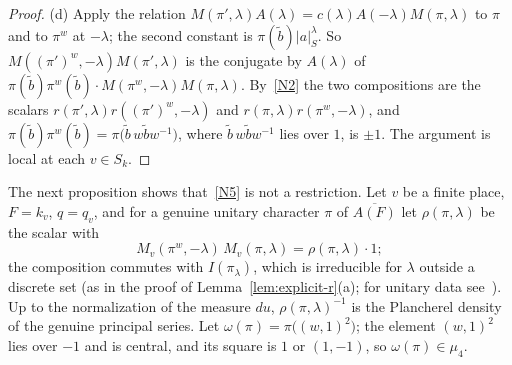 \begin{proof}
(d) Apply the relation $M(\pi',\lambda)A(\lambda)=c(\lambda)A(-\lambda)
M(\pi,\lambda)$ to $\pi$ and to $\pi^w$ at $-\lambda$; the second constant
is $\pi(\tilde b)|a|_S^{\lambda}$. So $M((\pi')^w,-\lambda)M(\pi',\lambda)$
is the conjugate by $A(\lambda)$ of $\pi(\tilde b)\pi^w(\tilde b)\cdot
M(\pi^w,-\lambda)M(\pi,\lambda)$. By~\ref{N2} the two compositions are the
scalars $r(\pi',\lambda)r((\pi')^w,-\lambda)$ and $r(\pi,\lambda)
r(\pi^w,-\lambda)$, and $\pi(\tilde b)\pi^w(\tilde b)=\pi\bigl(\tilde b\,
w\tilde bw^{-1}\bigr)$, where $\tilde b\,w\tilde bw^{-1}$ lies over $1$, is
$\pm1$. The argument is local at each $v\in S_k$.
\end{proof}

The next proposition shows that~\ref{N5} is not a restriction. Let $v$ be
a finite place, $F=k_v$, $q=q_v$, and for a genuine unitary character
$\pi$ of $\overline{A(F)}$ let $\rho(\pi,\lambda)$ be the scalar with
\[
M_v(\pi^w,-\lambda)\,M_v(\pi,\lambda)=\rho(\pi,\lambda)\cdot1 ;
\]
the composition commutes with $I(\pi_\lambda)$, which is irreducible for
$\lambda$ outside a discrete set (as in the proof of
Lemma~\ref{lem:explicit-r}(a); for unitary data see~\cite{Mo88}). Up to the normalization of the measure
$du$, $\rho(\pi,\lambda)^{-1}$ is the Plancherel density of the genuine
principal series. Let $\omega(\pi)=\pi\bigl((w,1)^2\bigr)$; the element
$(w,1)^2$ lies over $-1$ and is central, and its square is $1$ or
$(1,-1)$, so $\omega(\pi)\in\mu_4$.

